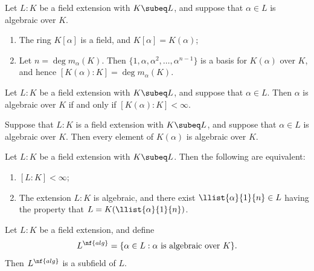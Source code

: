\documentclass{article}
\begin{document}
  \begin{ttheorem}
    Let \( L:K \) be a field extension with \( K\subeq L \), and suppose that \( \alpha\in L \) is algebraic over \( K \).
    \begin{enumerate}[label=(\roman*)]
      \item The ring \( K[\alpha] \) is a field, and \( K[\alpha]=K(\alpha) \);
      \item Let \( n=\deg m_\alpha(K) \). Then \( \{1,\alpha,\alpha^2,\ldots,\alpha^{n-1}\} \) is a basis for \( K(\alpha) \) over \( K \), and hence \( [K(\alpha):K]=\deg m_\alpha(K) \).
    \end{enumerate}
  \end{ttheorem}

  \begin{tproposition}
    Let \( L:K \) be a field extension with \( K\subeq L \), and suppose that \( \alpha\in L \).
    Then \( \alpha \) is algebraic over \( K \) if and only if \( [K(\alpha):K]<\infty \).
  \end{tproposition}

  \begin{tproposition}
    Suppose that \( L:K \) is a field extension with \( K\subeq L \), and suppose that \( \alpha\in L \) is algebraic over \( K \).
    Then every element of \( K(\alpha) \) is algebraic over \( K \).
  \end{tproposition}

  \begin{ttheorem}
    Let \( L:K \) be a field extension with \( K\subeq L \). Then the following are equivalent:
    \begin{enumerate}[label=(\roman*)]
      \item \( [L:K]<\infty \);
      \item The extension \( L:K \) is algebraic, and there exist \( \llist{\alpha}{1}{n}\in L \) having the property that \( L=K(\llist{\alpha}{1}{n}) \).
    \end{enumerate}
  \end{ttheorem}

  \begin{tproposition}
    Let \( L:K \) be a field extension, and define
    \begin{align*}
      L^{\nf{alg}}=\{\alpha\in L : \alpha \text{ is algebraic over } K\}.
    \end{align*}
    Then \( L^{\nf{alg}} \) is a subfield of \( L \).
  \end{tproposition}
\end{document}
